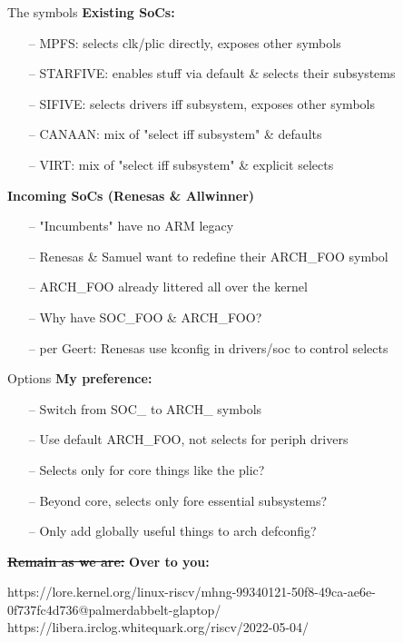 \documentclass{beamer}
\begin{document}
\begin{frame}{The symbols}
	\textbf{Existing SoCs:}
	\begin{itemize}
		\item[--]
		MPFS: selects clk/plic directly, exposes other symbols
		\item[--]
		STARFIVE: enables stuff via default \& selects their subsystems
		\item[--]
		SIFIVE: selects drivers iff subsystem, exposes other symbols
		\item[--]
		CANAAN: mix of "select iff subsystem" \& defaults
		\item[--]
		VIRT: mix of "select iff subsystem" \& explicit selects
	\end{itemize}
	\pause
	\textbf{Incoming SoCs (Renesas \& Allwinner)}
	\begin{itemize}
		\item[--]
		"Incumbents" have no ARM legacy
		\item[--]
		Renesas \& Samuel want to redefine their ARCH\_FOO symbol
		\item[--]
		ARCH\_FOO already littered all over the kernel
		\item[--]
		Why have SOC\_FOO \& ARCH\_FOO?
		\item[--]
		per Geert: Renesas use kconfig in drivers/soc to control selects
	\end{itemize}
\end{frame}

\begin{frame}{Options}
	\textbf{My preference:}
	\begin{itemize}
		\item[--]
		Switch from SOC\_ to ARCH\_ symbols
		\item[--]
		Use default ARCH\_FOO, not selects for periph drivers
		\item[--]
		Selects only for core things like the plic?
		\item[--]
		Beyond core, selects only fore essential subsystems?
		\item[--]
		Only add globally useful things to arch defconfig?
	\end{itemize}
	\pause
	\st{\textbf{Remain as we are:}}\newline
	\pause
	\textbf{Over to you:}
\end{frame}

\begin{thebibliography}{}
	https://lore.kernel.org/linux-riscv/mhng-99340121-50f8-49ca-ae6e-0f737fc4d736@palmerdabbelt-glaptop/ 
	https://libera.irclog.whitequark.org/riscv/2022-05-04/ 
\end{thebibliography}{}
\end{document}
